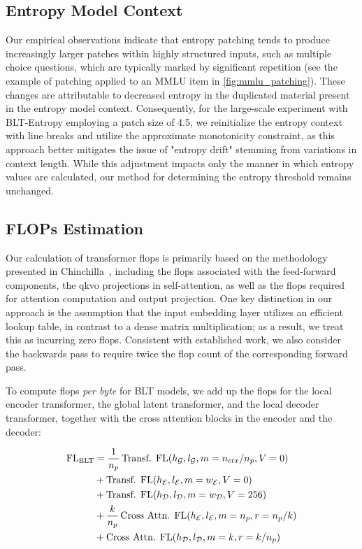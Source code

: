 \subsection{Entropy Model Context}
\label{section:entropy-context}
Our empirical observations indicate that entropy patching tends to produce increasingly larger patches within highly structured inputs, such as multiple choice questions, which are typically marked by significant repetition (see the example of patching applied to an MMLU item in \autoref{fig:mmlu_patching}). These changes are attributable to decreased entropy in the duplicated material present in the entropy model context. Consequently, for the large-scale experiment with {\textsc BLT}-Entropy employing a patch size of 4.5, we reinitialize the entropy context with line breaks and utilize the approximate monotonicity constraint, as this approach better mitigates the issue of "entropy drift" stemming from variations in context length. While this adjustment impacts only the manner in which entropy values are calculated, our method for determining the entropy threshold remains unchanged.

\subsection{FLOPs Estimation} 
\label{section:flops}

Our calculation of transformer flops is primarily based on the methodology presented in Chinchilla~\citep{hoffmann2022training}, including the flops associated with the feed-forward components, the qkvo projections in self-attention, as well as the flops required for attention computation and output projection. One key distinction in our approach is the assumption that the input embedding layer utilizes an efficient lookup table, in contrast to a dense matrix multiplication; as a result, we treat this as incurring zero flops. Consistent with established work, we also consider the backwards pass to require twice the flop count of the corresponding forward pass.

To compute flops \textit{per byte} for {\textsc BLT} models, we add up the flops for the local encoder transformer, the global latent transformer, and the local decoder transformer, together with the cross attention blocks in the encoder and the decoder:

\begin{align}
    \text{FL}_{\text{{\textsc BLT}}} &= \frac{1}{n_p}\,\text{Transf. FL}(h_{\mathcal{G}}, l_{\mathcal{G}}, m=n_{ctx}/n_p, V=0) \\
   &+ \text{Transf. FL}(h_{\mathcal{E}}, l_{\mathcal{E}}, m=w_{\mathcal{E}}, V=0) \\
   &+ \text{Transf. FL}(h_{\mathcal{D}}, l_{\mathcal{D}}, m=w_{\mathcal{D}}, V=256) \\ 
    &+ \frac{k}{n_p} \, \text{Cross Attn. FL}(h_{\mathcal{E}}, l_{\mathcal{E}}, m=n_p, r=n_p/k) \\ 
   &+ \text{Cross Attn. FL}(h_{\mathcal{D}}, l_{\mathcal{D}}, m=k, r=k/n_p)
\end{align}

